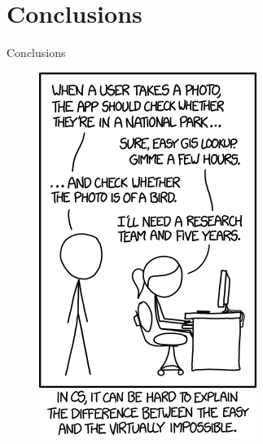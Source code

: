 \documentclass{beamer}
\begin{document}
\section{Conclusions}
\begin{frame}{Conclusions}
\begin{figure}[h]  
	\begin{minipage}[b]{0.3\textwidth}    
		\includegraphics[width=\textwidth]{img/joke}
  	\end{minipage}
  	\hfill
  	\begin{minipage}[t]{0.55\textwidth}

\end{minipage}
\end{figure}
\end{frame}
\end{document}
